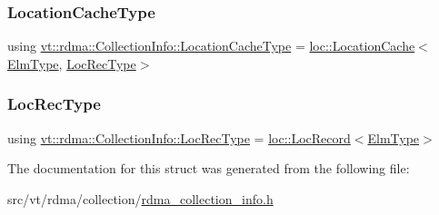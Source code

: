 \mbox{\label{structvt_1_1rdma_1_1_collection_info_a25a687ebde2ae64ae23dd9a7216071be}} 
\subsubsection{\texorpdfstring{Location\+Cache\+Type}{LocationCacheType}}
{\footnotesize\ttfamily using \hyperlink{structvt_1_1rdma_1_1_collection_info_a25a687ebde2ae64ae23dd9a7216071be}{vt\+::rdma\+::\+Collection\+Info\+::\+Location\+Cache\+Type} =  \hyperlink{structvt_1_1location_1_1_location_cache}{loc\+::\+Location\+Cache}$<$\hyperlink{structvt_1_1rdma_1_1_collection_info_a31cd8d00263f9260a6ca3d8e5cbc19e8}{Elm\+Type}, \hyperlink{structvt_1_1rdma_1_1_collection_info_ad1cd4adc9c3afc0f9fb472033423ee4b}{Loc\+Rec\+Type}$>$}

\mbox{\label{structvt_1_1rdma_1_1_collection_info_ad1cd4adc9c3afc0f9fb472033423ee4b}} 
\subsubsection{\texorpdfstring{Loc\+Rec\+Type}{LocRecType}}
{\footnotesize\ttfamily using \hyperlink{structvt_1_1rdma_1_1_collection_info_ad1cd4adc9c3afc0f9fb472033423ee4b}{vt\+::rdma\+::\+Collection\+Info\+::\+Loc\+Rec\+Type} =  \hyperlink{structvt_1_1location_1_1_loc_record}{loc\+::\+Loc\+Record}$<$\hyperlink{structvt_1_1rdma_1_1_collection_info_a31cd8d00263f9260a6ca3d8e5cbc19e8}{Elm\+Type}$>$}



The documentation for this struct was generated from the following file\+:\begin{DoxyCompactItemize}
\item 
src/vt/rdma/collection/\hyperlink{rdma__collection__info_8h}{rdma\+\_\+collection\+\_\+info.\+h}\end{DoxyCompactItemize}
